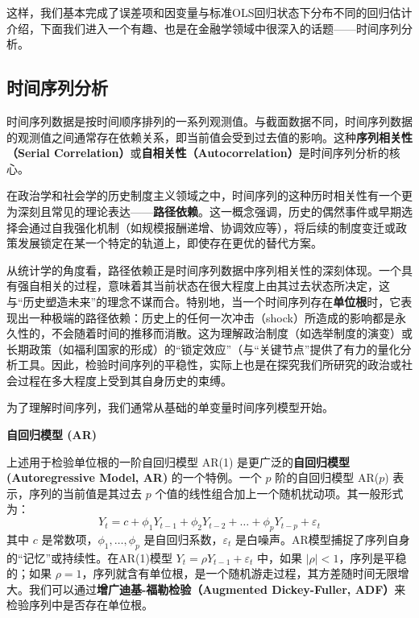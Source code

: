 这样，我们基本完成了误差项和因变量与标准OLS回归状态下分布不同的回归估计介绍，下面我们进入一个有趣、也是在金融学领域中很深入的话题——时间序列分析。

\subsection{时间序列分析}

时间序列数据是按时间顺序排列的一系列观测值。与截面数据不同，时间序列数据的观测值之间通常存在依赖关系，即当前值会受到过去值的影响。这种\textbf{序列相关性（Serial Correlation）}或\textbf{自相关性（Autocorrelation）}是时间序列分析的核心。

在政治学和社会学的历史制度主义领域之中，时间序列的这种历时相关性有一个更为深刻且常见的理论表达——\textbf{路径依赖}。这一概念强调，历史的偶然事件或早期选择会通过自我强化机制（如规模报酬递增、协调效应等），将后续的制度变迁或政策发展锁定在某一个特定的轨道上，即使存在更优的替代方案。

从统计学的角度看，路径依赖正是时间序列数据中序列相关性的深刻体现。一个具有强自相关的过程，意味着其当前状态在很大程度上由其过去状态所决定，这与“历史塑造未来”的理念不谋而合。特别地，当一个时间序列存在\textbf{单位根}时，它表现出一种极端的路径依赖：历史上的任何一次冲击（shock）所造成的影响都是永久性的，不会随着时间的推移而消散。这为理解政治制度（如选举制度的演变）或长期政策（如福利国家的形成）的“锁定效应”（与“关键节点”提供了有力的量化分析工具。因此，检验时间序列的平稳性，实际上也是在探究我们所研究的政治或社会过程在多大程度上受到其自身历史的束缚。

为了理解时间序列，我们通常从基础的单变量时间序列模型开始。

\textbf{自回归模型 (AR)}

上述用于检验单位根的一阶自回归模型 AR(1) 是更广泛的\textbf{自回归模型 (Autoregressive Model, AR)} 的一个特例。一个 $p$ 阶的自回归模型 AR($p$) 表示，序列的当前值是其过去 $p$ 个值的线性组合加上一个随机扰动项。其一般形式为：
\begin{equation}
	Y_t = c + \phi_1 Y_{t-1} + \phi_2 Y_{t-2} + \dots + \phi_p Y_{t-p} + \varepsilon_t
\end{equation}
其中 $c$ 是常数项，$\phi_1, \dots, \phi_p$ 是自回归系数，$\varepsilon_t$ 是白噪声。AR模型捕捉了序列自身的“记忆”或持续性。在AR(1)模型 $Y_t = \rho Y_{t-1} + \varepsilon_t$ 中，如果 $|\rho|<1$，序列是平稳的；如果 $\rho=1$，序列就含有单位根，是一个随机游走过程，其方差随时间无限增大。我们可以通过\textbf{增广迪基-福勒检验（Augmented Dickey-Fuller, ADF）}来检验序列中是否存在单位根。

